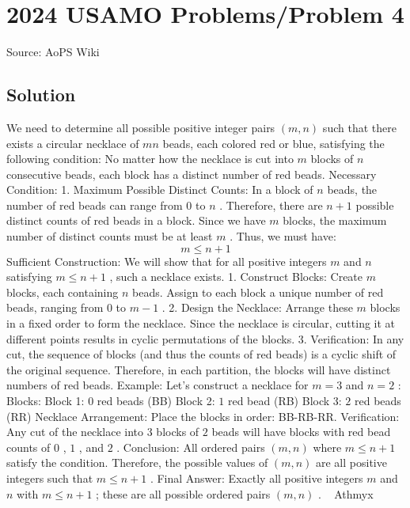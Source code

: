 \documentclass[12pt]{article}
\begin{document}
\section*{{2024 USAMO Problems/Problem 4}}
Source: AoPS Wiki

\subsection*{Solution}
We need to determine all possible positive integer pairs $(m, n)$ such that there exists a circular necklace of $mn$ beads, each colored red or blue, satisfying the following condition: No matter how the necklace is cut into $m$ blocks of $n$ consecutive beads, each block has a distinct number of red beads. Necessary Condition: 1. Maximum Possible Distinct Counts:
In a block of $n$ beads, the number of red beads can range from $0$ to $n$ .
Therefore, there are $n + 1$ possible distinct counts of red beads in a block.
Since we have $m$ blocks, the maximum number of distinct counts must be at least $m$ .
Thus, we must have: \[m \leq n + 1\] Sufficient Construction: We will show that for all positive integers $m$ and $n$ satisfying $m \leq n + 1$ , such a necklace exists. 1. Construct Blocks:
Create $m$ blocks, each containing $n$ beads. Assign to each block a unique number of red beads, ranging from $0$ to $m - 1$ . 2. Design the Necklace:
Arrange these $m$ blocks in a fixed order to form the necklace. Since the necklace is circular, cutting it at different points results in cyclic permutations of the blocks. 3. Verification:
In any cut, the sequence of blocks (and thus the counts of red beads) is a cyclic shift of the original sequence. Therefore, in each partition, the blocks will have distinct numbers of red beads. Example: Let's construct a necklace for $m = 3$ and $n = 2$ : Blocks:
Block 1: $0$ red beads (BB)
Block 2: $1$ red bead (RB)
Block 3: $2$ red beads (RR) Necklace Arrangement:
Place the blocks in order: BB-RB-RR. Verification:
Any cut of the necklace into $3$ blocks of $2$ beads will have blocks with red bead counts of $0$ , $1$ , and $2$ . Conclusion: All ordered pairs $(m, n)$ where $m \leq n + 1$ satisfy the condition.
Therefore, the possible values of $(m, n)$ are all positive integers such that $m \leq n + 1$ . Final Answer: Exactly all positive integers $m$ and $n$ with $m \leq n + 1$ ; these are all possible ordered pairs $(m, n)$ . ~ Athmyx
\end{document}
